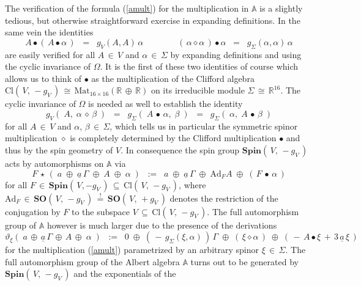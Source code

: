 \documentclass[12pt]{article}
\def\A{\mathbb{A}}
\def\Ad{\mathrm{Ad}}
\def\Cl{\mathrm{Cl}}
\def\R{\mathbb{R}}
\def\SO{\mathbf{SO}}
\def\Spin{\mathbf{Spin}}
\def\Z{\Sigma}
\begin{document}
 The verification of the formula (\ref{amult}) for the multiplication in
 $\A$ is a slightly tedious, but otherwise straightforward exercise in
 expanding definitions. In the same vein the identities
 \begin{equation}\label{2id}
  A\bullet(\,A\bullet\alpha\,)
  \;\;=\;\;
  g_V(A,A)\,\alpha
  \qquad\qquad
  (\,\alpha\diamond\alpha\,)\bullet\alpha
  \;\;=\;\;
  g_\Z(\alpha,\alpha)\,\alpha
 \end{equation}
 are easily verified for all $A\,\in\,V$ and $\alpha\,\in\,\Z$ by
 expanding definitions and using the cyclic invariance of $\Omega$.
 It is the first of these two identities of course which allows us to think
 of $\bullet$ as the multiplication of the Clifford algebra $\Cl(\,V,\,
 -g_V\,)\,\cong\,\mathrm{Mat}_{16\times16}(\R\,\oplus\,\R)$ on its
 irreducible module $\Z\,\cong\,\R^{16}$. The cyclic invariance of
 $\Omega$ is needed as well to establish the identity
 \begin{equation}\label{syms}
  g_V(\;A,\;\alpha\,\diamond\,\beta\;)
  \;\;=\;\;
  g_\Z(\;A\,\bullet\,\alpha,\;\beta\;)
  \;\;=\;\;
  g_\Z(\;\alpha,\;A\,\bullet\,\beta\;)
 \end{equation}
 for all $A\,\in\,V$ and $\alpha,\,\beta\,\in\,\Z$, which tells us in
 particular the symmetric spinor multiplication $\diamond$ is completely
 determined by the Clifford multiplication $\bullet$ and thus by the spin
 geometry of $V$. In consequence the spin group $\Spin(\,V,\,-g_V\,)$ acts
 by automorphisms on $\A$ via
 $$
  F\,\star\,(\;a\;\oplus\;\underline a\,\Gamma\;\oplus\;A\;\oplus\;\alpha\;)
  \;\;:=\;\;
  a\;\oplus\;\underline a\,\Gamma\;\oplus\;\Ad_FA\;\oplus\;
  (\,F\,\bullet\,\alpha\,)
 $$
 for all $F\,\in\,\Spin(\,V,-g_V\,)\,\subseteq\,\Cl(\,V,\,-g_V\,)$,
 where $\Ad_F\,\in\,\SO(\,V,\,-g_V\,)\,\stackrel!=\,\SO(\,V,\,+g_V\,)$ denotes
 the restriction of the conjugation by $F$ to the subspace $V\,\subseteq\,
 \Cl(\,V,\,-g_V\,)$. The full automorphism group of $\A$ however is much
 larger due to the presence of the derivations
 \begin{equation}\label{sd}
  \vartheta_\xi(\;a\,\oplus\,\underline a\,\Gamma\,\oplus\,A\,\oplus\;\alpha\;)
  \;\;:=\;\;
  0\;\oplus\;(\,-\,g_\Z(\xi,\alpha)\,)\,\Gamma\;\oplus\;(\,\xi\diamond\alpha\,)
  \;\oplus\;(\,-\,A\bullet\xi\,+\,3\,\underline a\,\xi\,)
 \end{equation}
 for the multiplication (\ref{amult}) parametrized by an arbitrary spinor
 $\xi\,\in\,\Z$. The full automorphism group of the Albert algebra $\A$ turns
 out to be generated by $\Spin(\,V,\,-g_V\,)$ and the exponentials of the
\end{document}
